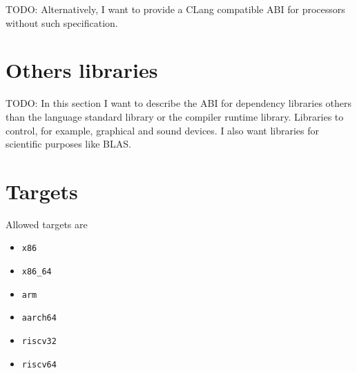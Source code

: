 \documentclass[
   article,                      %
   10pt,                         %
   openright,                    %
   oneside,                      %
   a4paper,                      %
   sumario = tradicional,        %
   english,                      %
   xcolor=table                  %
]{abntex2}
\begin{document}
TODO: Alternatively, I want to provide a CLang compatible ABI for processors
without such specification.

\section{Others libraries}

TODO: In this section I want to describe the ABI for dependency
libraries others than
the language standard library or the compiler runtime library.
Libraries to control, for example, graphical and sound devices.
I also want libraries for scientific purposes like BLAS.

\section{Targets}
\label{apendice:target}

Allowed targets are
\begin{itemize}
   \item \texttt{x86}
   \item \texttt{x86\_64}
   \item \texttt{arm}
   \item \texttt{aarch64}
   \item \texttt{riscv32}
   \item \texttt{riscv64}
\end{itemize}
\end{document}
